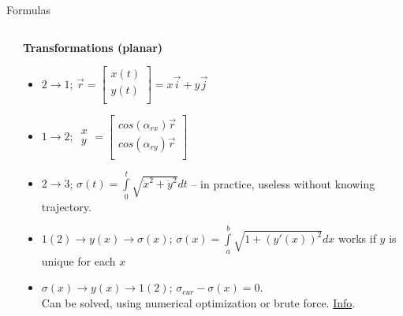 \documentclass[aspectratio=169,xcolor=table,10pt, notes=hide]{beamer}
\begin{document}
\begin{frame}[t]{Formulas}
\begin{columns}[T,onlytextwidth]
\begin{column}{0.42\textwidth}
    \end{column}
        \begin{column}{0.60\textwidth}
        \textbf{Transformations (planar)}
        \vspace{-0.3cm}
        \begin{multicols}{2}
            \begin{itemize}
                \footnotesize
                \item $2 \rightarrow 1$; $\vec{r} = \begin{bmatrix}x(t)\\y(t)\\\end{bmatrix} = x\vec{i} + y\vec{j}$
                \item $1 \rightarrow 2$; $\begin{matrix} x\\ y\end{matrix} = \begin{bmatrix}
            cos(\alpha_{rx})\vec{r}\\
            cos(\alpha_{ry})\vec{r}\\\end{bmatrix}$
            \end{itemize}
        \end{multicols}
        \vspace{-0.3cm}
        \begin{itemize}
            \footnotesize
           \item $2 \rightarrow 3$; $\sigma(t)=\int \limits _{0}^{t}{\sqrt {\dot{x}^2 + \dot{y}^2}}dt$ -- in practice, useless without knowing trajectory.
           \item $1(2) \rightarrow y(x) \rightarrow \sigma(x)$; $\sigma(x)=\int \limits _{a}^{b}{\sqrt {1+(y'(x))^{2}}}dx$ works if $y$ is unique for each $x$
           \item $\sigma(x) \rightarrow y(x) \rightarrow 1(2)$; $\sigma_{cur} - \sigma(x) =0$.\\ Can be solved, using numerical optimization or brute force. \href{https://en.wikipedia.org/wiki/Differentiable\_curve\#Length\_and\_natural\_parametrization}{Info}.
           \end{itemize}
        \end{column}
        \end{columns}
    \end{frame}
\end{document}
